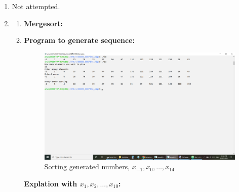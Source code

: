 \documentclass[12pt,a4paper,final]{article}
\theoremstyle{definition}
\begin{document}
\begin{enumerate}
\begin{enumerate}
\end{enumerate}


\item
Not attempted.

\item
\begin{enumerate}
\item
\textbf{Mergesort: }



\item
\textbf{Program to generate sequence: }


\begin{figure}[H]
\includegraphics[width=1.0\textwidth]{3b.png}
\caption{Sorting generated numbers, $x_{-1},x_0,\dots,x_{14}$}
\label{fig:3b}
\end{figure}

\textbf{Explation with $x_1,x_2,\dots,x_{10}$:} 


\end{enumerate}
\end{enumerate}
\end{document}
